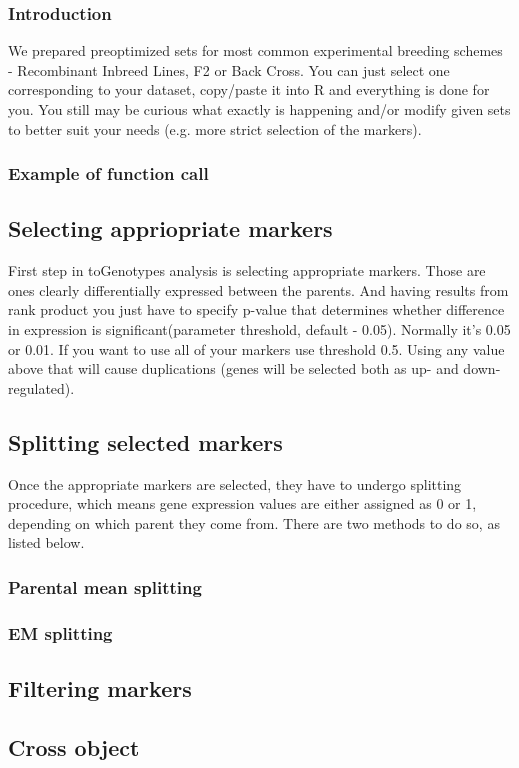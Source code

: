 \documentclass{article}
\begin{document}
\subsubsection{Introduction}
We prepared preoptimized sets for most common experimental breeding schemes - Recombinant Inbreed Lines, F2 or Back Cross. You can just select one corresponding to your dataset, copy/paste it into R and everything is done for you. You still may be curious what exactly is happening and/or modify given sets to better suit your needs (e.g. more strict selection of the markers).
\subsubsection{Example of function call}
\subsection{Selecting appriopriate markers}
First step in toGenotypes analysis is selecting appropriate markers. Those are ones clearly differentially expressed between the parents. And having results from rank product you just have to specify p-value that determines whether difference in expression is significant(parameter threshold, default - 0.05). Normally it's 0.05 or 0.01. If you want to use all of your markers use threshold 0.5. Using any value above that will cause duplications (genes will be selected both as up- and down-regulated).
\subsection{Splitting selected markers} 
{\noindent}Once the appropriate markers are selected, they have to undergo splitting procedure, which means gene expression values are either assigned as 0 or 1, depending on which parent they come from. There are two methods to do so, as listed below.
\subsubsection{Parental mean splitting}
\blindtext
\subsubsection{EM splitting}
\blindtext
\subsection{Filtering markers}
\blindtext
\subsection{Cross object}
\blindtext[2]
\end{document}
